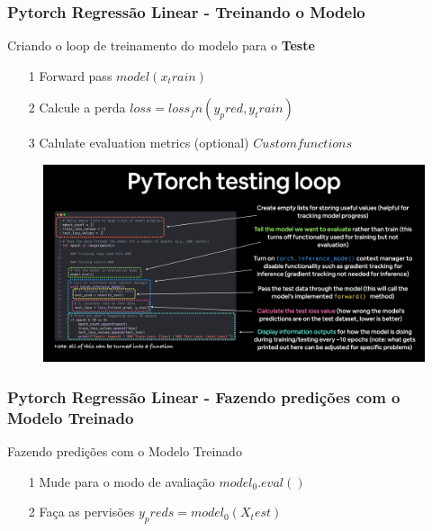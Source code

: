 \documentclass{beamer}
\begin{document}
\begin{frame}
	\frametitle{Pytorch Regressão Linear - Treinando o Modelo}
	\begin{block}{Criando o loop de treinamento do modelo para o \textbf{Teste}}
		\begin{itemize}
			\item[1] Forward pass $model(x_train)$ 
			\item[2] Calcule a perda $loss = loss_fn(y_pred, y_train)$
			\item[3] Calulate evaluation metrics (optional) $Custom functions$
		\end{itemize}
		\begin{figure}
			\centering
			\includegraphics[width=0.7\linewidth]{figures/steps_test_torch}
		\end{figure}
		
	\end{block}
\end{frame}
\begin{frame}
	\frametitle{Pytorch Regressão Linear - Fazendo predições com o Modelo Treinado}
	\begin{block}{Fazendo predições com o Modelo Treinado}
		\begin{itemize}
			\item[1] Mude para o modo de avaliação $model_0.eval()$
			\item[2] Faça as pervisões $y_preds = model_0(X_test)$
		\end{itemize}
	
	\end{block}
\end{frame}
\end{document}
